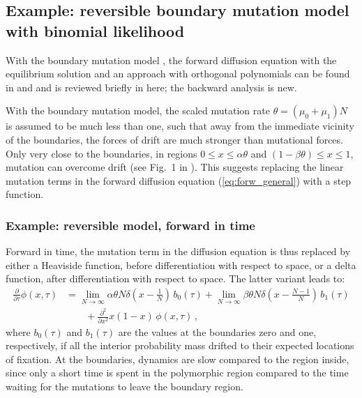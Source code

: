 \documentclass[preprint]{elsarticle}
\begin{document}
\subsection{Example: reversible boundary mutation model with binomial likelihood}

With the boundary mutation model \citep{Vogl15,Vogl16}, the forward diffusion equation with the equilibrium solution and an approach with orthogonal polynomials can be found in \citet{Vogl14b} and \citet{Vogl15,Vogl16} and is reviewed briefly in here; the backward analysis is new.

With the  boundary mutation model, the scaled mutation rate $\theta=(\mu_0+\mu_1)N$ is assumed to be much less than one, such that away from the immediate vicinity of the boundaries, the forces of drift are much stronger than mutational forces. Only very close to the boundaries, in regions $0\leq x \leq\alpha\theta$ and $(1-\beta\theta) \leq x \leq 1$, mutation can overcome drift (see Fig.~1 in \citet{Vogl15}). This suggests replacing the linear mutation terms in the forward diffusion equation (\ref{eq:forw_general}) with a step function.

\subsubsection{Example: reversible model, forward in time}

Forward in time, the mutation term in the diffusion equation is thus replaced by either a Heaviside function, before differentiation with respect to space, or a delta function, after differentiation with respect to space. The latter variant leads to:
\begin{equation}\label{eq:forw_bounddrift}
\begin{split}
\frac{\partial}{\partial \tau} \phi(x,\tau)&=
    \lim_{N\to\infty}\alpha\theta N\delta(x-\tfrac1N) \,b_0(\tau)
    +\lim_{N\to\infty}\beta\theta N\delta(x-\tfrac{N-1}N) \,b_1(\tau)\\
    &\qquad+\frac{\partial^2}{\partial x^2}x(1-x)\,\phi(x,\tau)\,,
\end{split}
\end{equation}
where $b_0(\tau)$ and $b_1(\tau)$ are the values at the boundaries zero and one, respectively, if all the interior probability mass drifted to their expected locations of fixation. At the boundaries, dynamics are slow compared to the region inside, since only a short time is spent in the polymorphic region compared to the time waiting for the mutations to leave the boundary region. 
\end{document}
